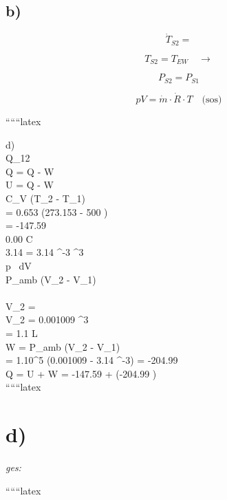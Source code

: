 \subsection*{b)}

\[
\dot{T}_{S2} = 
\]

\[
T_{S2} = T_{EW} \quad \rightarrow
\]

\[
P_{S2} = P_{S1}
\]

\[
pV = \dot{m} \cdot \dot{R} \cdot T \quad \text{(sos)}
\]

``````latex


d) \\
 Q_{12} \\

\Delta Q = Q - W \\

\Delta U = Q - W \\

C_V (T_2 - T_1) \\

= 0.653 (273.153 - 500 ) \\

= -147.59  \\

0.00 \degree C   \\

3.14  = 3.14 ^{-3} ^3 \\

\int p \, dV \\

P_{amb} (V_2 - V_1) \\

  \\

V_2 =  \\

V_2 = 0.001009 ^3 \\

= 1.1 L \\

W = P_{amb} (V_2 - V_1) \\

= 1.10^5 \left(0.001009 - 3.14 ^{-3}\right) = -204.99  \\

Q = \Delta U + W = -147.59  + (-204.99 ) \\

``````latex


\section*{d)}

\textit{ges:}

``````latex


